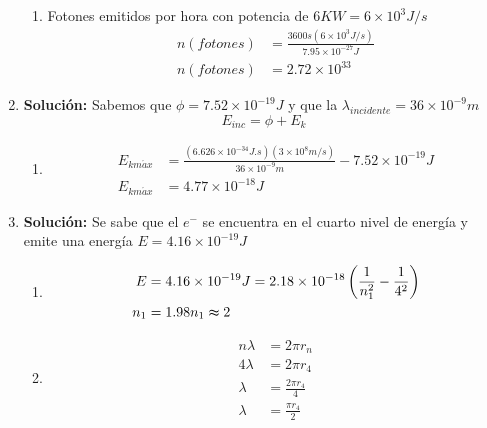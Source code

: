 \documentclass{article}
\begin{document}
\begin{enumerate}
\begin{enumerate}
        \item
        Fotones emitidos por hora con potencia de $6KW = 6 \times 10^{3} J/s$
        \begin{equation*}
            \begin{split}
                n(fotones) &= \frac{3600s ( 6 \times 10^{3} J/s)}{7.95 \times 10^{-27}J}\\
                n(fotones) &= 2.72 \times 10^{33}
            \end{split}
        \end{equation*}
    \end{enumerate}
    

    \item 
    \textbf{Solución:}
    Sabemos que $\phi = 7.52 \times 10^{-19}J$ y que la $\lambda_{incidente} = 36 \times 10^{-9}m$
    $$ E_{inc} = \phi + E_k$$
    \begin{enumerate}
        \item 
        \begin{equation*}
            \begin{split}
                E_{km\acute{a}x} &= \frac{(6.626 \times 10^{-34}J.s)(3 \times 10^{8}m/s)}{36 \times 10^{-9}m} -  7.52 \times 10^{-19}J\\
                E_{km\acute{a}x} &= 4.77 \times 10^{-18}J
            \end{split}
        \end{equation*}
    \end{enumerate}


    \item 
    \textbf{Solución:}
    Se sabe que el $e^{-}$ se encuentra en el cuarto nivel de energ\'ia y emite una energ\'ia $E = 4.16 \times 10^{-19}J$ 
    \begin{enumerate}
        \item 
        \begin{equation*}
            \begin{split}
                E &= 4.16 \times 10^{-19}J = 2.18 \times 10^{-18} \left(\frac{1}{n_1^{2}} - \frac{1}{4^{2}}\right)\\
                n_1 &= 1.98 
                n_1 \thickapprox 2
            \end{split}
        \end{equation*}
    
        \item
        \begin{equation*}
            \begin{split}
                n\lambda & = 2\pi r_n\\
                4\lambda & = 2\pi r_4\\
                \lambda & = \frac{2\pi r_4}{4}\\ 
                \lambda & = \frac{\pi r_4}{2} 
            \end{split}
        \end{equation*}


\end{enumerate}
\end{enumerate}
\end{document}
